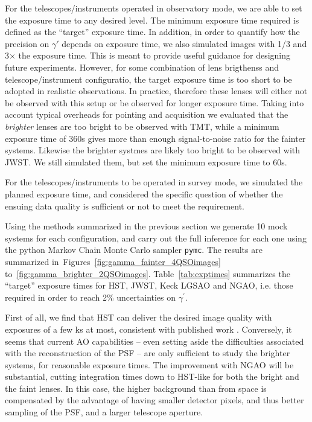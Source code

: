 \documentclass[a4paper,11pt]{article}
\begin{document}
For the telescopes/instruments operated in observatory mode, we are
able to set the exposure time to any desired level. The minimum
exposure time required is defined as the ``target'' exposure time. In
addition, in order to quantify how the precision on $\gamma'$ depends
on exposure time, we also simulated images with 1/3 and 3$\times$ the
exposure time. This is meant to provide useful guidance for designing
future experiments. However, for some combination of lens brigthenss
and telescope/instrument configuratio, the target exposure time is too
short to be adopted in realistic observations. In practice, therefore
these lenses will either not be observed with this setup or be
observed for longer exposure time. Taking into account typical
overheads for pointing and acquisition we evaluated that the {\it
brighter} lenses are too bright to be observed with TMT, while a
minimum exposure time of 360s gives more than enough signal-to-noise
ratio for the fainter systems. Likewise the brighter systmes are
likely too bright to be observed with JWST. We still simulated them,
but set the minimum exposure time to 60s.

For the telescopes/instruments to be operated in survey mode, we
simulated the planned exposure time, and considered the specific
question of whether the ensuing data quality is sufficient or not to
meet the requirement.

Using the methods summarized in the previous section we generate 10
mock systems for each configuration, and carry out the full inference
for each one using the python Markov Chain Monte Carlo sampler
\texttt{pymc}.  The results are summarized 
in~Figures~\ref{fig:gamma_fainter_4QSOimages}
to~\ref{fig:gamma_brighter_2QSOimages}. Table~\ref{tab:exptimes}
summarizes the ``target'' exposure times for HST, JWST, Keck LGSAO and
NGAO, i.e. those required in order to reach 2\% uncertainties on
$\gamma^{\prime}$. 

First of all, we find that HST can deliver the desired image quality
with exposures of a few ks at most, consistent with published work
\cite{2013ApJ...766...70S}. Conversely, 
it seems that current AO capabilities -- even setting aside the
difficulties associated with the reconstruction of the PSF -- are only
sufficient to study the brighter systems, for reasonable exposure
times. The improvement with NGAO will be substantial, cutting
integration times down to HST-like for both the bright and the faint
lenses. In this case, the higher background than from space is
compensated by the advantage of having smaller detector pixels, and
thus better sampling of the PSF, and a larger telescope aperture.
\end{document}
